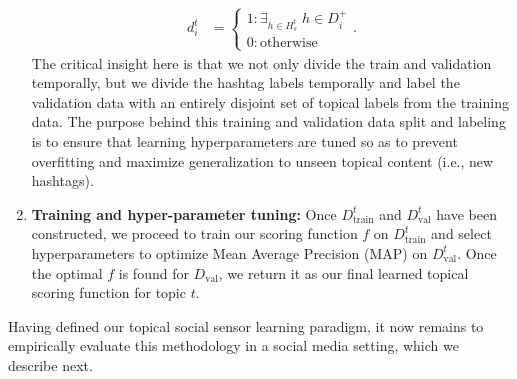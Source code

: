 \begin{enumerate}
\begin{align*}
d_{i}^{t} & =
  \begin{cases}
    1: \exists_{h \in H^t_s} \; h \in D_i^+ \\
    0: \mathrm{otherwise}
  \end{cases} .
\end{align*}
The critical insight here is that we not only divide the train and validation
temporally, but we divide the hashtag labels temporally and label the validation
data with an entirely disjoint set of topical labels from the training data.
The purpose behind this training and validation data split
and labeling is to ensure that learning hyperparameters are tuned so as
to prevent overfitting and maximize generalization to unseen topical
content (i.e., new hashtags).
\item {\bf Training and hyper-parameter tuning:}
Once $D^t_\mathrm{train}$ and $D^t_\mathrm{val}$ have been constructed,
we proceed to train our scoring function $f$ on $D^t_\mathrm{train}$ and
select hyperparameters to optimize Mean Average Precision (MAP) on
$D^t_\mathrm{val}$.  Once the optimal $f$ is found for $D_\mathrm{val}$,
we return it as our final learned topical scoring function for topic $t$.
\end{enumerate}
Having defined our topical social sensor learning paradigm, it now remains
to empirically evaluate this methodology in a social media setting, which
we describe next.
